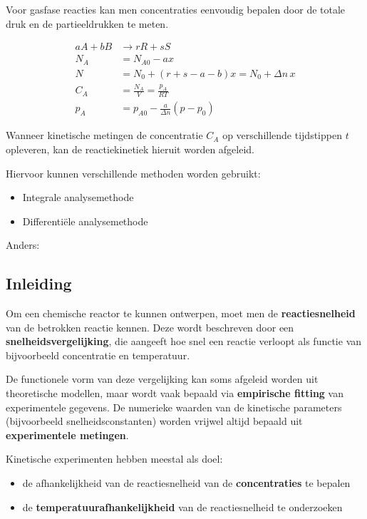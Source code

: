 \documentclass{ximera}
\begin{document}
\begin{example}
Voor gasfase reacties kan men concentraties eenvoudig bepalen door de totale druk en de partieeldrukken te meten.

\[
\begin{aligned}
aA + bB &\rightarrow rR + sS \\[6pt]
N_A &= N_{A0} - ax \\
N &= N_0 + (r + s - a - b)x = N_0 + \Delta n\,x \\[6pt]
C_A &= \frac{N_A}{V} = \frac{p_A}{RT} \\
p_A &= p_{A0} - \frac{a}{\Delta n}(p - p_0)
\end{aligned}
\]
\end{example}

Wanneer kinetische metingen de concentratie $C_A$ op verschillende tijdstippen $t$ opleveren, 
kan de reactiekinetiek hieruit worden afgeleid. 

Hiervoor kunnen verschillende methoden worden gebruikt:
\begin{itemize}
    \item Integrale analysemethode
    \item Differentiële analysemethode
\end{itemize}


Anders:
\subsection*{Inleiding}

Om een chemische reactor te kunnen ontwerpen, moet men de \textbf{reactiesnelheid}
van de betrokken reactie kennen. Deze wordt beschreven door een
\textbf{snelheidsvergelijking}, die aangeeft hoe snel een reactie verloopt als functie
van bijvoorbeeld concentratie en temperatuur.

De functionele vorm van deze vergelijking kan soms afgeleid worden uit
theoretische modellen, maar wordt vaak bepaald via \textbf{empirische fitting}
van experimentele gegevens. De numerieke waarden van de kinetische parameters
(bijvoorbeeld snelheidsconstanten) worden vrijwel altijd bepaald uit
\textbf{experimentele metingen}.

Kinetische experimenten hebben meestal als doel:
\begin{itemize}
\item de afhankelijkheid van de reactiesnelheid van de \textbf{concentraties} te bepalen
\item de \textbf{temperatuurafhankelijkheid} van de reactiesnelheid te onderzoeken
\end{itemize}
\end{document}
